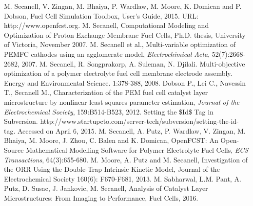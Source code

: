 
\begin{thebibliography}{99}

 M. Secanell, V. Zingan, M. Bhaiya, P. Wardlaw, M. Moore, K. Domican and P. Dobson, Fuel Cell Simulation Toolbox, User's Guide, 2015. URL: http://www.openfcst.org.
 M. Secanell, Computational Modeling and Optimization of Proton Exchange Membrane Fuel Cells, Ph.D. thesis, University of Victoria, November 2007.
 M. Secanell et al., Multi-variable optimization of PEMFC cathodes using an agglomerate model, \textit{Electrochimical Acta}, 52(7):2668-2682, 2007.
 M. Secanell, R. Songprakorp, A. Suleman, N. Djilali.  Multi-objective optimization of a polymer electrolyte fuel cell membrane electrode assembly. Energy and Environmental Science. 1:378-388, 2008.
 Dobson P., Lei C., Navessin T., Secanell M., Characterization of the PEM fuel cell catalyst layer microstructure by nonlinear least-squares parameter estimation, \textit{Journal of the Electrochemical Society}, 159:B514-B523, 2012.
 Setting the \$Id\$ Tag in Subversion. http://www.startupcto.com/server-tech/subversion/setting-the-id-tag. Accessed on April 6, 2015.
 M. Secanell, A. Putz, P. Wardlaw, V. Zingan, M. Bhaiya, M. Moore, J. Zhou, C. Balen and K. Domican, OpenFCST: An Open-Source Mathematical Modelling Software for Polymer Electrolyte Fuel Cells, \textit{ECS Transactions}, 64(3):655-680.
 M. Moore, A. Putz and M. Secanell, Investigation of the ORR Using the Double-Trap Intrinsic Kinetic Model, Journal of the Electrochemical Society 160(6): F670-F681, 2013.
 M. Sabharwal, L.M. Pant, A. Putz, D. Susac, J. Jankovic, M. Secanell, Analysis of Catalyst Layer Microstructures: From Imaging to Performance, Fuel Cells, 2016.


\end{thebibliography}


